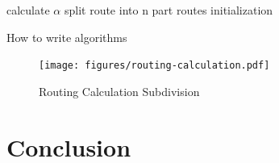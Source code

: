 \documentclass[journal]{IEEEtran}
\begin{document}
\begin{algorithm}[H]
  \SetLine
	calculate $\alpha$
	split route into n part routes 
  initialization\;
  \caption{How to write algorithms}
\end{algorithm}

\begin{figure}
    \centering
    \texttt{[image: figures/routing-calculation.pdf]}
    \caption{Routing Calculation Subdivision}%
    \label{fig:routing:calculation:subdivision}
\end{figure}

\section{Conclusion}


\nocite{*}


\end{document}
